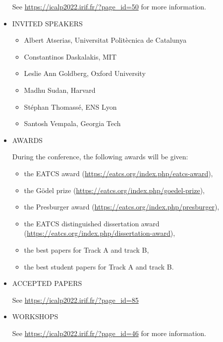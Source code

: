 \documentclass[prodmode,acmtecs]{acmsmall} %
\begin{document}
\begin{itemize}
  See \href{https://icalp2022.irif.fr/?page_id=50}{https://icalp2022.irif.fr/?page\_id=50} for more information. 
 
\item  INVITED SPEAKERS  
 
\begin{itemize}\item  Albert Atserias, Universitat Politècnica de Catalunya
\item  Constantinos Daskalakis, MIT 
\item  Leslie Ann Goldberg, Oxford University 
\item  Madhu Sudan, Harvard 
\item  Stéphan Thomassé, ENS Lyon 
\item  Santosh Vempala, Georgia Tech
\end{itemize} 
\item  AWARDS  
 
  During the conference, the following awards will be given: 
 
\begin{itemize}\item  the EATCS award (\href{https://eatcs.org/index.php/eatcs-award}{https://eatcs.org/index.php/eatcs-award}),
\item  the Gödel prize (\href{https://eatcs.org/index.php/goedel-prize}{https://eatcs.org/index.php/goedel-prize}),
\item  the Presburger award (\href{https://eatcs.org/index.php/presburger}{https://eatcs.org/index.php/presburger}),
\item  the EATCS distinguished dissertation award (\href{https://eatcs.org/index.php/dissertation-award}{https://eatcs.org/index.php/dissertation-award}),
\item  the best papers for Track A and track B,
\item  the best student papers for Track A and track B.
\end{itemize} 
\item  ACCEPTED PAPERS  
 
  See \href{https://icalp2022.irif.fr/?page_id=85}{https://icalp2022.irif.fr/?page\_id=85}  
 
\item  WORKSHOPS  
 
  See \href{https://icalp2022.irif.fr/?page_id=46}{https://icalp2022.irif.fr/?page\_id=46} for more information. 
 

\end{itemize}
\end{document}
